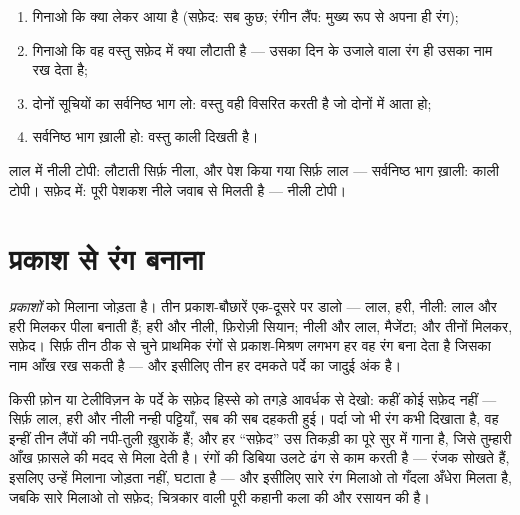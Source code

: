 \begin{method}[किसी भी प्रकाश में रंग की भविष्यवाणी]\label{met:g8:colors-spectra:predict}
\begin{enumerate}
  \item गिनाओ कि  क्या लेकर आया है (सफ़ेद: सब कुछ; रंगीन लैंप:
        मुख्य रूप से अपना ही रंग);
  \item गिनाओ कि वह वस्तु सफ़ेद  में क्या लौटाती है --- उसका
        दिन के उजाले वाला रंग ही उसका नाम रख देता है;
  \item दोनों सूचियों का सर्वनिष्ठ भाग लो: वस्तु वही विसरित करती है जो
        दोनों में आता हो;
  \item सर्वनिष्ठ भाग ख़ाली हो: वस्तु काली दिखती है।
\end{enumerate}
लाल  में नीली टोपी: लौटाती सिर्फ़ नीला, और पेश किया गया सिर्फ़
लाल --- सर्वनिष्ठ भाग ख़ाली: काली टोपी। सफ़ेद  में: पूरी पेशकश
नीले जवाब से मिलती है --- नीली टोपी।
\end{method}

\section{प्रकाश से रंग बनाना}

\begin{example}[तीन लैंप सारे रंग बना देते हैं]\label{ex:g8:colors-spectra:additive}
\emph{प्रकाशों} को मिलाना जोड़ता है। तीन प्रकाश-बौछारें एक-दूसरे पर
डालो --- लाल, हरी, नीली: लाल और हरी मिलकर पीला बनाती हैं; हरी और
नीली, फ़िरोज़ी सियान; नीली और लाल, मैजेंटा; और तीनों मिलकर, सफ़ेद।
सिर्फ़ तीन ठीक से चुने प्राथमिक रंगों से प्रकाश-मिश्रण लगभग हर वह रंग
बना देता है जिसका नाम आँख रख सकती है --- और इसीलिए तीन हर दमकते पर्दे
का जादुई अंक है।
\end{example}

\begin{example}[तुम्हारी जेब में बैठा पर्दा]\label{ex:g8:colors-spectra:screen}
किसी फ़ोन या टेलीविज़न के पर्दे के सफ़ेद हिस्से को तगड़े आवर्धक से
देखो: कहीं कोई सफ़ेद नहीं --- सिर्फ़ लाल, हरी और नीली नन्ही पट्टियाँ,
सब की सब दहकती हुई। पर्दा जो भी रंग कभी दिखाता है, वह इन्हीं तीन
लैंपों की नपी-तुली ख़ुराकें हैं; और हर ``सफ़ेद'' उस तिकड़ी का पूरे
सुर में गाना है, जिसे तुम्हारी आँख फ़ासले की मदद से मिला देती है। रंगों
की डिबिया उलटे ढंग से काम करती है --- रंजक सोखते हैं, इसलिए उन्हें
मिलाना  जोड़ता नहीं, घटाता है --- और इसीलिए सारे रंग मिलाओ तो
गँदला अँधेरा मिलता है, जबकि सारे  मिलाओ तो सफ़ेद; चित्रकार वाली
पूरी कहानी कला की  और रसायन की है।
\end{example}

